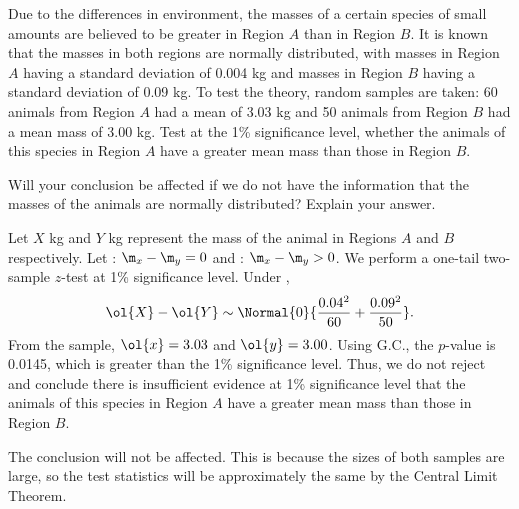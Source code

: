 \begin{problem}
    Due to the differences in environment, the masses of a certain species of small amounts are believed to be greater in Region $A$ than in Region $B$. It is known that the masses in both regions are normally distributed, with masses in Region $A$ having a standard deviation of 0.004 kg and masses in Region $B$ having a standard deviation of 0.09 kg. To test the theory, random samples are taken: 60 animals from Region $A$ had a mean of 3.03 kg and 50 animals from Region $B$ had a mean mass of 3.00 kg. Test at the 1\% significance level, whether the animals of this species in Region $A$ have a greater mean mass than those in Region $B$.

    Will your conclusion be affected if we do not have the information that the masses of the animals are normally distributed? Explain your answer.
\end{problem}
\begin{solution}
    Let $X$ kg and $Y$ kg represent the mass of the animal in Regions $A$ and $B$ respectively. Let \nullhyp: $\m_x - \m_y = 0$ and \althyp: $\m_x - \m_y > 0$. We perform a one-tail two-sample $z$-test at 1\% significance level. Under \nullhyp, \[\ol{X} - \ol{Y} \sim \Normal{0}{\frac{0.04^2}{60} + \frac{0.09^2}{50}}.\] From the sample, $\ol{x} = 3.03$ and $\ol{y} = 3.00$. Using G.C., the $p$-value is 0.0145, which is greater than the 1\% significance level. Thus, we do not reject \nullhyp{} and conclude there is insufficient evidence at 1\% significance level that the animals of this species in Region $A$ have a greater mean mass than those in Region $B$.

    The conclusion will not be affected. This is because the sizes of both samples are large, so the test statistics will be approximately the same by the Central Limit Theorem.
\end{solution}